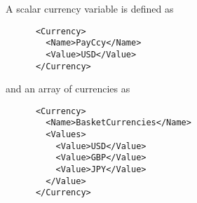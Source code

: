 A scalar currency variable is defined as

\begin{verbatim}
      <Currency>
        <Name>PayCcy</Name>
        <Value>USD</Value>
      </Currency>
\end{verbatim}

and an array of currencies as

\begin{verbatim}
      <Currency>
        <Name>BasketCurrencies</Name>
        <Values>
          <Value>USD</Value>
          <Value>GBP</Value>
          <Value>JPY</Value>
        </Value>
      </Currency>
\end{verbatim}

